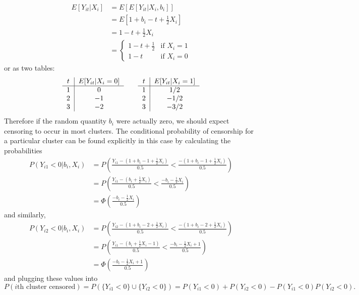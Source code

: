 \documentclass[11pt]{article}
\begin{document}
\begin{enumerate}
\begin{enumerate}
\begin{align*}
					E[Y_{it}|X_i] &= E[E[Y_{it}|X_i,b_i]] \\
					&= E[1+b_i-t+\frac{1}{2} X_i] \\
					&= 1 - t + \frac{1}{2}X_i \\
					&= \begin{cases}
						1 - t + \frac{1}{2} & \text{if } X_i = 1 \\
						1 - t & \text{if } X_i = 0
					\end{cases}
				\end{align*}
				or as two tables:
\[
				\begin{tabular}{c|c}
				$t$ & $E[Y_{it}|X_i=0]$ \\
				\hline
				1 & 0 \\
				2 & $-1$ \\
				3 & $-2$ \\
				\end{tabular}
				\quad\quad
				\begin{tabular}{c|c}
				$t$ & $E[Y_{it}|X_i=1]$ \\
				\hline
				1 & $1/2$ \\
				2 & $-1/2$ \\
				3 & $-3/2$ \\
				\end{tabular}
\]
Therefore if the random quantity $b_i$ were actually zero, we should expect censoring to occur in most clusters. The conditional probability of censorship for a particular cluster can be found explicitly in this case by calculating the probabilities
\begin{align*}
	P(Y_{i1}<0 | b_i, X_i) &= P\left(\frac{Y_{i1}-(1+b_i-1+\frac{1}{2}X_i)}{0.5} < \frac{-(1+b_i-1+\frac{1}{2}X_i)}{0.5} \right) \\
	&= P\left(\frac{Y_{i1}-(b_i+\frac{1}{2}X_i)}{0.5} < \frac{-b_i-\frac{1}{2}X_i}{0.5} \right) \\
	&= \Phi\left(\frac{-b_i-\frac{1}{2}X_i}{0.5} \right)
\end{align*}
and similarly,
\begin{align*}
	P(Y_{i2}<0 | b_i, X_i) &= P\left(\frac{Y_{i2}-(1+b_i-2+\frac{1}{2}X_i)}{0.5} < \frac{-(1+b_i-2+\frac{1}{2}X_i)}{0.5} \right) \\
	&= P\left(\frac{Y_{i1}-(b_i+\frac{1}{2}X_i-1)}{0.5} < \frac{-b_i-\frac{1}{2}X_i+1}{0.5} \right) \\
	&= \Phi\left(\frac{-b_i-\frac{1}{2}X_i+1}{0.5} \right)
\end{align*}
and plugging these values into 
\[
	P(i\text{th cluster censored}) = P(\{Y_{i1}<0\} \cup \{Y_{i2}<0\}) = P(Y_{i1}<0) + P(Y_{i2}<0) - P(Y_{i1}<0)P(Y_{i2}<0).
\]
\end{enumerate}
\end{enumerate}
\end{document}
